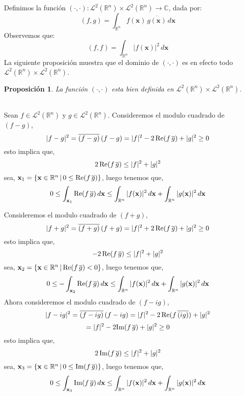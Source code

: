 \documentclass[12pt]{book}
\numberwithin{equation}{chapter}
\newtheorem{proposition}[theorem]{Proposici\'on}
\def\n{\noindent}
\def\ol{\overline}
\def\R{\mathbb{R}}
\def\C{\mathbb{C}}
\def\L{\mathcal{L}}
\def\rar{\rightarrow}
\def\x{\mathbf{x}}
\begin{document}
\vspace{5 mm}

\n Definimos la funci\'on $( \cdot , \cdot ) : \L^{2}(\R^{n}) \times \L^{2}(\R^{n}) \rar \C $, dada por: 
\begin{equation}\label{prod}
 ( f,g )= \int_{\R^{n}} f(\x)\, \ol{g(\x)} \, d\x
\end{equation}
Observemos que:
$$ (f,f)= \int_{\R^{n}} |f(\x)|^{2} \, d\x $$
La siguiente proposici\'on muestra que el dominio de $(\cdot , \cdot)$ es en efecto todo $\L^{2}(\R^{n}) \times \L^{2}(\R^{n})$.

\begin{proposition}\label{ppl2}
La funci\'on $( \cdot , \cdot )$ esta bien definida en $\L^{2}(\R^{n}) \times \L^{2}(\R^{n})$.
\end{proposition}
\n {\bf Demostraci\'on}\\
Sean $f \in \L^{2}(\R^{n})$ y $g \in \L^{2}(\R^{n})$. Consideremos el modulo cuadrado de $(f-g)$,
$$ |f-g|^{2} = \ol{(f-g)}\, (f-g)= |f|^{2} - 2\, \hbox{Re}(f\, \ol{g}) +|g|^{2} \geq 0  $$
esto implica que,
$$ 2\, \hbox{Re}(f\, \ol{g}) \leq |f|^{2} + |g|^{2} $$
sea, $\x_{1}= \{ \x \in \R^{n} \,|\, 0 \leq \hbox{Re}(f\, \ol{g})  \} $, luego tenemos que,
$$ 0 \leq \int_{\x_{1}} \hbox{Re}(f\, \ol{g}) \, d\x \leq \int_{\R^{n}} |f(\x)|^{2}\, d\x  + \int_{\R^{n}} |g(\x)|^{2}\, d\x $$

\n Consideremos el modulo cuadrado de $(f+g)$,
$$ |f+g|^{2} = \ol{(f+g)}\, (f+g)= |f|^{2} + 2\, \hbox{Re}(f\, \ol{g}) +|g|^{2} \geq 0  $$
esto implica que,
$$ -2\, \hbox{Re}(f\, \ol{g}) \leq |f|^{2} + |g|^{2} $$
sea, $\x_{2}= \{ \x \in \R^{n} \,|\,  \hbox{Re}(f\, \ol{g}) < 0  \} $, luego tenemos que,
$$ 0 \leq -\int_{\x_{2}} \hbox{Re}(f\, \ol{g}) \, d\x \leq \int_{\R^{n}} |f(\x)|^{2}\, d\x  + \int_{\R^{n}} |g(\x)|^{2}\, d\x $$
Ahora consideremos el modulo cuadrado de $(f-ig)$,
$$ |f-ig|^{2} = \ol{(f-ig)}\, (f-ig)= |f|^{2} - 2\, \hbox{Re}(f\, \ol{(ig)}) +|g|^{2} $$
$$ = |f|^{2} - 2 \hbox{Im}(f\,\ol{g}) + |g|^{2} \geq 0 $$
esto implica que,
$$ 2\, \hbox{Im}(f\, \ol{g}) \leq |f|^{2} + |g|^{2} $$
sea, $\x_{3}= \{ \x \in \R^{n} \,|\, 0 \leq \hbox{Im}(f\, \ol{g})  \} $, luego tenemos que,
$$ 0 \leq \int_{\x_{3}} \hbox{Im}(f\, \ol{g}) \, d\x \leq \int_{\R^{n}} |f(\x)|^{2}\, d\x  + \int_{\R^{n}} |g(\x)|^{2}\, d\x $$
\end{document}
